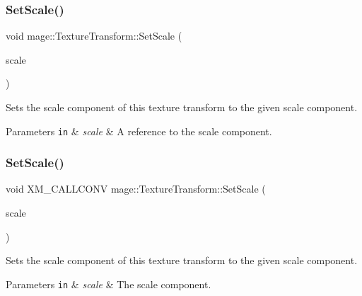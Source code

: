 \subsubsection{\texorpdfstring{Set\+Scale()}{SetScale()}\hspace{0.1cm}{\footnotesize\ttfamily [3/4]}}
{\footnotesize\ttfamily void mage\+::\+Texture\+Transform\+::\+Set\+Scale (\begin{DoxyParamCaption}\item[{const X\+M\+F\+L\+O\+A\+T2 \&}]{scale }\end{DoxyParamCaption})\hspace{0.3cm}{\ttfamily [noexcept]}}

Sets the scale component of this texture transform to the given scale component.


\begin{DoxyParams}[1]{Parameters}
\mbox{\tt in}  & {\em scale} & A reference to the scale component. \\
\hline
\end{DoxyParams}
\hypertarget{structmage_1_1_texture_transform_a22ba108c7623abc2abdd8f9fde4d53bd}{}\label{structmage_1_1_texture_transform_a22ba108c7623abc2abdd8f9fde4d53bd} 
\subsubsection{\texorpdfstring{Set\+Scale()}{SetScale()}\hspace{0.1cm}{\footnotesize\ttfamily [4/4]}}
{\footnotesize\ttfamily void X\+M\+\_\+\+C\+A\+L\+L\+C\+O\+NV mage\+::\+Texture\+Transform\+::\+Set\+Scale (\begin{DoxyParamCaption}\item[{F\+X\+M\+V\+E\+C\+T\+OR}]{scale }\end{DoxyParamCaption})\hspace{0.3cm}{\ttfamily [noexcept]}}

Sets the scale component of this texture transform to the given scale component.


\begin{DoxyParams}[1]{Parameters}
\mbox{\tt in}  & {\em scale} & The scale component. \\
\hline
\end{DoxyParams}
\hypertarget{structmage_1_1_texture_transform_acf3079f1edcdf17d087b751286953f06}{}\label{structmage_1_1_texture_transform_acf3079f1edcdf17d087b751286953f06} 
